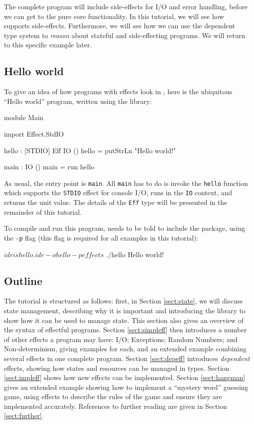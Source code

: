 The complete program will include side-effects for I/O and error handling,
before we can get to the pure core functionality. In this tutorial, we will
see how \Idris{} supports side-effects. Furthermore, we will see how we can 
use the dependent type system to \emph{reason} about stateful and
side-effecting programs. We will return to this specific example later.

\subsection{Hello world}

To give an idea of how programs with effects look in \Idris{}, here is the
ubiquitous ``Hello world'' program, written using the \effects{} library:

\begin{code}
module Main
  
import Effect.StdIO
  
hello : { [STDIO] } Eff IO ()
hello = putStrLn "Hello world!"
  
main : IO ()
main = run hello
\end{code}

\noindent
As usual, the entry point is \texttt{main}. All \texttt{main} has to do is
invoke the \texttt{hello} function which supports the \texttt{STDIO} effect
for console I/O, runs in the \texttt{IO} context, and returns the unit
value. The details of the \texttt{Eff} type will be presented in the
remainder of this tutorial.

To compile and run this program, \Idris{} needs to be told to include the
\effects{} package, using the \texttt{-p} \effects{} flag (this flag
is required for all examples in this tutorial):

\begin{code}
$ idris hello.idr -o hello -p effects
$ ./hello
Hello world!
\end{code}

\subsection{Outline}

The tutorial is structured as follows: first, in Section \ref{sect:state},
we will discuss state management, describing why it is important and introducing
the \effects{} library to show how it can be used to manage state. This section
also gives an overview of the syntax of effectful programs. Section
\ref{sect:simpleff} then introduces a number of other effects a program may
have: I/O; Exceptions; Random Numbers; and Non-determinism, giving examples
for each, and an extended example combining several effects in one complete
program. Section \ref{sect:depeff} introduces \emph{dependent} effects, showing
how states and resources can be managed in types. Section \ref{sect:impleff}
shows how new effects can be implemented. Section \ref{sect:hangman}
gives an extended example showing how to implement a ``mystery word'' guessing
game, using effects to describe the rules of the game and ensure they are
implemented accurately. References to further reading are given in
Section \ref{sect:further}.


